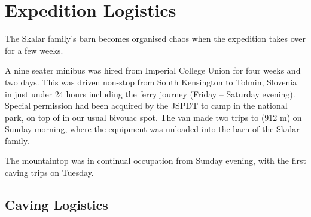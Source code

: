 \section{Expedition Logistics}


    \begin{marginfigure}
\checkoddpage \ifoddpage \forcerectofloat \else \forceversofloat \fi
\centering
 \caption{The Skalar family's barn becomes organised chaos when the expedition takes over for a few weeks. }
 \label{Skalar barn}
\end{marginfigure}

A nine seater minibus was hired from Imperial College Union for four weeks and two days. 
This was driven
non-stop from \passage[town]South Kensington to \passage[town]Tolmin, Slovenia in just under 24 hours
including the ferry journey (Friday -- Saturday evening). Special permission
had been acquired by the JSPDT to camp in the national park, on top of 
in our usual bivouac spot. The van made two trips to  (912 m) on
Sunday morning, where the equipment was unloaded into the barn of the Skalar
family. 

The mountaintop was in continual occupation from Sunday evening, with the first
caving trips on Tuesday.

\subsection{Caving Logistics}


